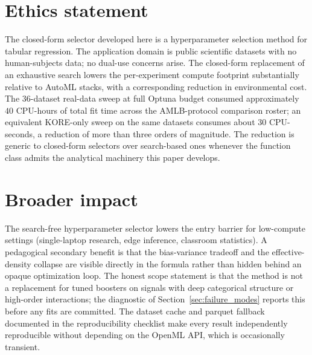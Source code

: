 \documentclass{article}
\begin{document}
\section*{Ethics statement}

The closed-form selector developed here is a hyperparameter selection method for tabular regression. The application domain is public scientific datasets with no human-subjects data; no dual-use concerns arise. The closed-form replacement of an exhaustive search lowers the per-experiment compute footprint substantially relative to AutoML stacks, with a corresponding reduction in environmental cost. The $36$-dataset real-data sweep at full Optuna budget consumed approximately $40$ CPU-hours of total fit time across the AMLB-protocol comparison roster; an equivalent KORE-only sweep on the same datasets consumes about $30$ CPU-seconds, a reduction of more than three orders of magnitude. The reduction is generic to closed-form selectors over search-based ones whenever the function class admits the analytical machinery this paper develops.

\section*{Broader impact}

The search-free hyperparameter selector lowers the entry barrier for low-compute settings (single-laptop research, edge inference, classroom statistics). A pedagogical secondary benefit is that the bias-variance tradeoff and the effective-density collapse are visible directly in the formula rather than hidden behind an opaque optimization loop. The honest scope statement is that the method is not a replacement for tuned boosters on signals with deep categorical structure or high-order interactions; the diagnostic of Section~\ref{sec:failure_modes} reports this before any fits are committed. The dataset cache and parquet fallback documented in the reproducibility checklist make every result independently reproducible without depending on the OpenML API, which is occasionally transient.
\end{document}
